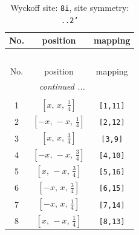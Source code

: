 \documentclass[fleqn,8pt]{jsarticle}
\begin{document}
\renewcommand{\arraystretch}{1.2}
\begin{longtable}{ccc}
\caption{Wyckoff site: {\tt 8i}, site symmetry: {\tt ..2'}}
 \\
 \hline \hline
No. & position & mapping \\ \hline \endfirsthead

\multicolumn{2}{l}{\tablename\ \thetable{}} \\
 \hline \hline
No. & position & mapping \\ \hline \endhead

 \hline \hline
\multicolumn{2}{r}{\footnotesize\it continued ...} \\ \endfoot

 \hline \hline
\multicolumn{2}{r}{} \\ \endlastfoot

1 & $\left[ x,\, x,\, \frac{1}{4} \right]$ & {\tt [1,11]} \\ \hline
2 & $\left[ - x,\, - x,\, \frac{1}{4} \right]$ & {\tt [2,12]} \\ \hline
3 & $\left[ x,\, x,\, \frac{3}{4} \right]$ & {\tt [3,9]} \\ \hline
4 & $\left[ - x,\, - x,\, \frac{3}{4} \right]$ & {\tt [4,10]} \\ \hline
5 & $\left[ x,\, - x,\, \frac{3}{4} \right]$ & {\tt [5,16]} \\ \hline
6 & $\left[ - x,\, x,\, \frac{3}{4} \right]$ & {\tt [6,15]} \\ \hline
7 & $\left[ - x,\, x,\, \frac{1}{4} \right]$ & {\tt [7,14]} \\ \hline
8 & $\left[ x,\, - x,\, \frac{1}{4} \right]$ & {\tt [8,13]} \\
\end{longtable}
\renewcommand{\arraystretch}{1.2}
\end{document}
